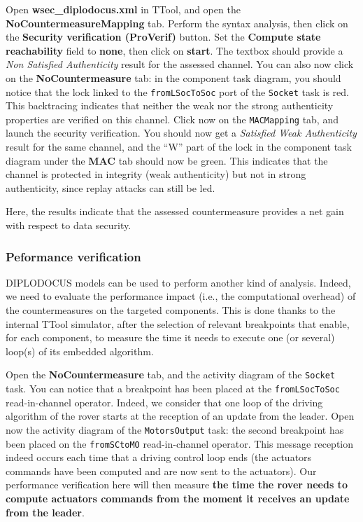 \documentclass{article}
\begin{document}
Open \textbf{wsec\_diplodocus.xml} in TTool, and open the \textbf{NoCountermeasureMapping} tab. Perform the syntax analysis, then click on the \textbf{Security verification (ProVerif)} button. Set the \textbf{Compute state reachability} field to \textbf{none}, then click on \textbf{start}. The textbox should provide a \emph{Non Satisfied Authenticity} result for the assessed channel. You can also now click on the \textbf{NoCountermeasure} tab: in the component task diagram, you should notice that the lock linked to the \texttt{fromLSocToSoc} port of the \texttt{Socket} task is red. This backtracing indicates that neither the weak nor the strong authenticity properties are verified on this channel. Click now on the \texttt{MACMapping} tab, and launch the security verification. You should now get a \emph{Satisfied Weak Authenticity} result for the same channel, and the ``W'' part of the lock in the component task diagram under the \textbf{MAC} tab should now be green. This indicates that the channel is protected in integrity (weak authenticity) but not in strong authenticity, since replay attacks can still be led.

Here, the results indicate that the assessed countermeasure provides a net gain with respect to data security.

\subsubsection{Peformance verification}

DIPLODOCUS models can be used to perform another kind of analysis. Indeed, we need to evaluate the performance impact (i.e., the computational overhead) of the countermeasures on the targeted components. This is done thanks to the internal TTool simulator, after the selection of relevant breakpoints that enable, for each component, to measure the time it needs to execute one (or several) loop(s) of its embedded algorithm.

Open the \textbf{NoCountermeasure} tab, and the activity diagram of the \texttt{Socket} task. You can notice that a breakpoint has been placed at the \texttt{fromLSocToSoc} read-in-channel operator. Indeed, we consider that one loop of the driving algorithm of the rover starts at the reception of an update from the leader. Open now the activity diagram of the \texttt{MotorsOutput} task: the second breakpoint has been placed on the \texttt{fromSCtoMO} read-in-channel operator. This message reception indeed occurs each time that a driving control loop ends (the actuators commands have been computed and are now sent to the actuators). Our performance verification here will then measure \textbf{the time the rover needs to compute actuators commands from the moment it receives an update from the leader}.
\end{document}
